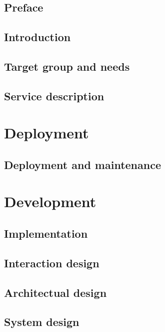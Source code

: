 \frontmatter
\chapter*{Preface}

\chapter{Introduction}


\chapter{Target group and needs}


\chapter{Service description}


\mainmatter
\part{Deployment}

\chapter{Deployment and maintenance}


\part{Development}

\chapter{Implementation}


\chapter{Interaction design}


\chapter{Architectual design}


\chapter{System design}




%

%


\backmatter


